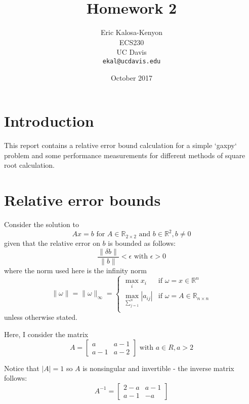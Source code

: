 \documentclass[12pt,fleqn,leqno,letterpaper]{article}
\title{Homework 2}
\author{Eric Kalosa-Kenyon\\
\small{ECS230}\\
\small{UC Davis}\\
\small{\texttt{ekal@ucdavis.edu}}
}
\date{October 2017}
\begin{document}
\maketitle



% 


\section{Introduction}
This report contains a relative error bound calculation for a simple `gaxpy`
problem and some performance measurements for different methods of square root
calculation.

\section{Relative error bounds}
Consider the solution to
$$Ax=b \textrm{ for } A\in\mathbb{R}_{2\times 2}
\textrm{ and } b\in\mathbb{R}^2, b\neq 0$$
given that the relative error on $b$ is bounded as follows:
$$\frac{\|\delta b\|}{\|b\|}<\epsilon \textrm{ with } \epsilon>0$$
where the norm used here is the infinity norm
$$\|\omega\|=\|\omega\|_\infty=
\begin{cases}
    \underset{i}{\max} x_i &\text{if } \omega = x \in \mathbb{R}^n\\
    \underset{\sum_{j=1}^n}{\max} |a_{ij}| &\text{if } \omega = A \in
    \mathbb{R}_{n\times n}\\
\end{cases}
$$
unless otherwise stated.

Here, I consider the matrix
$$
A =
\left[
\begin{array}{cc}
    a & a-1 \\
    a-1 & a-2
\end{array}
\right]
\textrm{ with } a\in R, a>2
$$

Notice that $|A|=1$ so $A$ is nonsingular and invertible - the inverse matrix
follows:
$$
A^{-1} = \left[ \begin{array}{cc}
    2-a & a-1 \\
    a-1 & -a
\end{array}\right]
$$
\end{document}
